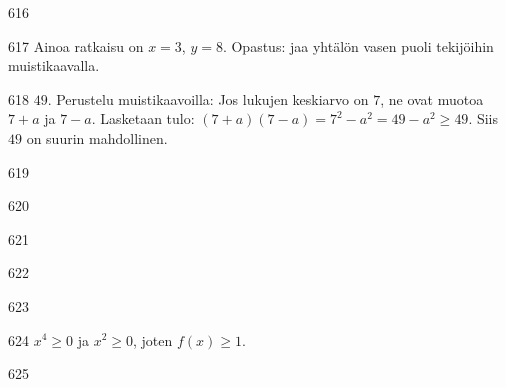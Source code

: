 \begin{Vastaus}{616}
    
\end{Vastaus}
\begin{Vastaus}{617}
    Ainoa ratkaisu on $x = 3$, $y=8$. Opastus: jaa yhtälön vasen puoli tekijöihin muistikaavalla.
    
\end{Vastaus}
\begin{Vastaus}{618}
        $49$. Perustelu muistikaavoilla: Jos lukujen keskiarvo on $7$, ne ovat muotoa $7+a$ ja $7-a$. Lasketaan tulo: $(7+a)(7-a)=7^2-a^2 = 49-a^2 \geq 49$. Siis $49$ on suurin mahdollinen.
    
\end{Vastaus}
\begin{Vastaus}{619}
	
\end{Vastaus}
\begin{Vastaus}{620}
	
\end{Vastaus}
\begin{Vastaus}{621}
    
\end{Vastaus}
\begin{Vastaus}{622}
	
\end{Vastaus}
\begin{Vastaus}{623}
    
\end{Vastaus}
\begin{Vastaus}{624}
     $x^4\geq 0$ ja $x^2 \geq 0$, joten $f(x) \geq 1$.
    
\end{Vastaus}
\begin{Vastaus}{625}
	
\end{Vastaus}
